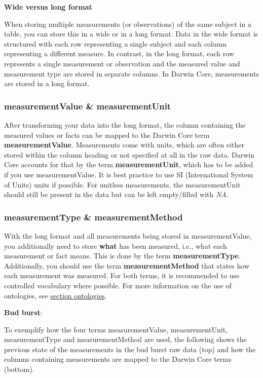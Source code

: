 \documentclass[
]{book}
\begin{document}
\textbf{Wide versus long format}

When storing multiple measurements (or observations) of the same subject in a table, you can store this in a wide or in a long format. Data in the wide format is structured with each row representing a single subject and each column representing a different measure. In contrast, in the long format, each row represents a single measurement or observation and the measured value and measurement type are stored in separate columns. In Darwin Core, measurements are stored in a long format.

\hypertarget{measurementvalue-measurementunit}{%
\subsubsection{measurementValue \& measurementUnit}\label{measurementvalue-measurementunit}}

After transforming your data into the long format, the column containing the measured values or facts can be mapped to the Darwin Core term \textbf{measurementValue}. Measurements come with units, which are often either stored within the column heading or not specified at all in the raw data. Darwin Core accounts for that by the term \textbf{measurementUnit}, which has to be added if you use measurementValue. It is best practice to use SI (International System of Units) units if possible. For unitless measurements, the measurementUnit should still be present in the data but can be left empty/filled with \emph{NA}.

\hypertarget{measurementtype-measurementmethod}{%
\subsubsection{measurementType \& measurementMethod}\label{measurementtype-measurementmethod}}

With the long format and all measurements being stored in measurementValue, you additionally need to store \textbf{what} has been measured, i.e., what each measurement or fact means. This is done by the term \textbf{measurementType}. Additionally, you should use the term \textbf{measurementMethod} that states how each measurement was measured. For both terms, it is recommended to use controlled vocabulary where possible. For more information on the use of ontologies, see \protect\hyperlink{ontologies}{section ontologies}.

\textbf{Bud burst}:

To exemplify how the four terms measurementValue, measurementUnit, measurementType and measurementMethod are used, the following shows the previous state of the measurements in the bud burst raw data (top) and how the columns containing measurements are mapped to the Darwin Core terms (bottom).
\end{document}
